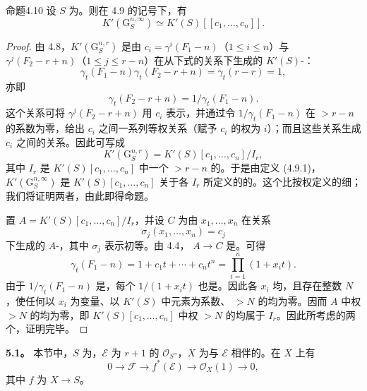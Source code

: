 \begin{SGAresult}{命题}{4.10}
设 $S$ 为。则在 4.9 的记号下，有
\[
K'(\mathrm G_S^{n,\infty})\simeq K'(S)[[c_1,\ldots,c_n]].
\]
\end{SGAresult}
\begin{proof}
由 4.8，$K'(\mathrm G_S^{n,r})$ 是由 $c_i=\gamma^i(F_1-n)$（$1\leq i\leq n$）与 $\gamma^j(F_2-r+n)$（$1\leq j\leq r-n$）在从下式的关系下生成的 $K'(S)$-：
\[
\gamma_t(F_1-n)\gamma_t(F_2-r+n)=\gamma_t(r-r)=1,
\]
亦即
\[
\gamma_t(F_2-r+n)=1/\gamma_t(F_1-n).
\]
这个关系可将 $\gamma^j(F_2-r+n)$ 用 $c_i$ 表示，并通过令 $1/\gamma_t(F_1-n)$ 在 $>r-n$ 的系数为零，给出 $c_i$ 之间一系列等权关系（赋予 $c_i$ 的权为 $i$）；而且这些关系生成 $c_i$ 之间的关系。因此可写成
\[
K'(\mathrm G_S^{n,r})=K'(S)[c_1,\ldots,c_n]/I_r,
\]
其中 $I_r$ 是 $K'(S)[c_1,\ldots,c_n]$ 中一个 $>r-n$ 的。于是由定义 (4.9.1)，$K'(\mathrm G_S^{n,\infty})$ 是 $K'(S)[c_1,\ldots,c_n]$ 关于各 $I_r$ 所定义的的。这个比按权定义的细；我们将证明两者，由此即得命题。

置 $A=K'(S)[c_1,\ldots,c_n]/I_r$，并设 $C$ 为由 $x_1,\ldots,x_n$ 在关系
\[
\sigma_j(x_1,\ldots,x_n)=c_j
\]
下生成的 $A$-，其中 $\sigma_j$ 表示初等。由 4.4， $A\longrightarrow C$ 是。可得
\[
\gamma_t(F_1-n)=1+c_1t+\cdots+c_nt^n=\prod_{i=1}^n(1+x_it).
\]
由于 $1/\gamma_t(F_1-n)$ 是，每个 $1/(1+x_it)$ 也是。因此各 $x_i$ 均，且存在整数 $N$，使任何以 $x_i$ 为变量、以 $K'(S)$ 中元素为系数、 $>N$ 的均为零。因而 $A$ 中权 $>N$ 的均为零，即 $K'(S)[c_1,\ldots,c_n]$ 中权 $>N$ 的均属于 $I_r$。因此所考虑的两个，证明完毕。
\end{proof}

\textbf{5.1。} 本节中，$S$ 为，$\mathcal E$ 为 $r+1$ 的 $\mathcal O_S$-，$X$ 为与 $\mathcal E$ 相伴的。在 $X$ 上有
\[
0\longrightarrow\mathcal F\longrightarrow f^*(\mathcal E)\longrightarrow\mathcal O_X(1)\longrightarrow0,
\]
其中 $f$ 为 $X\longrightarrow S$。

